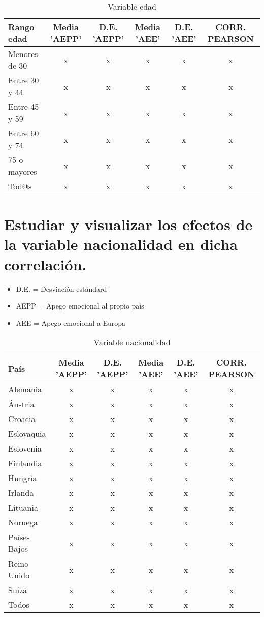 \documentclass{article}
\begin{document}
 \begin{table}[h!]
 \caption{Variable edad}
 \begin{tabular}{l | c c c c c}
 \hline
 \bf{Rango edad} & \bf{Media 'AEPP'} & \bf{D.E. 'AEPP'} & \bf{Media 'AEE'} & \bf{D.E. 'AEE'} & \bf{CORR. PEARSON} \\
 \hline
 Menores de 30 & x & x & x & x & x \\
 Entre 30 y 44 & x & x & x & x & x \\
 Entre 45 y 59 & x & x & x & x & x \\
 Entre 60 y 74 & x & x & x & x & x \\
 75 o mayores & x & x & x & x & x \\
 Tod@s & x & x & x & x & x \\
 \hline
 \end{tabular}
 \end{table}

\section{Estudiar y visualizar los efectos de la variable nacionalidad en dicha correlación.}
 \begin{itemize}
 \item D.E. = Desviación estándard
 \item AEPP = Apego emocional al propio país
 \item AEE = Apego emocional a Europa
 \end{itemize}
 
 \begin{table}[h!]
 \caption{Variable nacionalidad}
 \begin{tabular}{l | c c c c c}
 \hline
 \bf{País} & \bf{Media 'AEPP'} & \bf{D.E. 'AEPP'} & \bf{Media 'AEE'} & \bf{D.E. 'AEE'} & \bf{CORR. PEARSON} \\
 \hline
 Alemania & x & x & x & x & x \\
 Áustria & x & x & x & x & x \\
 Croacia & x & x & x & x & x \\
 Eslovaquia & x & x & x & x & x \\
 Eslovenia & x & x & x & x & x \\
 Finlandia & x & x & x & x & x \\
 Hungría & x & x & x & x & x \\
 Irlanda & x & x & x & x & x \\
 Lituania & x & x & x & x & x \\
 Noruega & x & x & x & x & x \\
 Países Bajos & x & x & x & x & x \\
 Reino Unido & x & x & x & x & x \\
 Suiza & x & x & x & x & x \\
 Todos & x & x & x & x & x \\
 \hline
 \end{tabular}
 \end{table}
\end{document}
